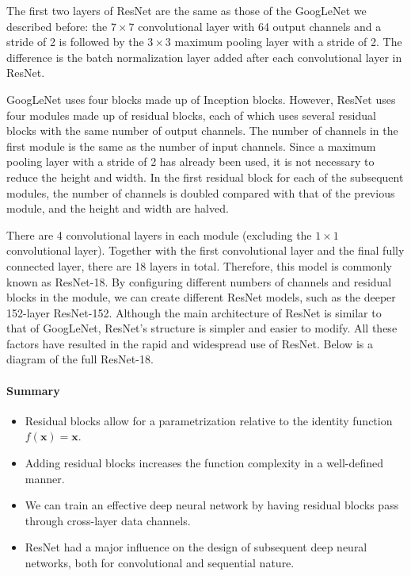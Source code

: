 The first two layers of ResNet are the same as those of the GoogLeNet we described before: the $7\times 7$ convolutional layer with 64 output channels and a stride of 2 is followed by the $3\times 3$ maximum pooling layer with a stride of 2. The difference is the batch normalization layer added after each convolutional layer in ResNet.

GoogLeNet uses four blocks made up of Inception blocks. However, ResNet uses four modules made up of residual blocks, each of which uses several residual blocks with the same number of output channels. The number of channels in the first module is the same as the number of input channels. Since a maximum pooling layer with a stride of 2 has already been used, it is not necessary to reduce the height and width. In the first residual block for each of the subsequent modules, the number of channels is doubled compared with that of the previous module, and the height and width are halved.

There are 4 convolutional layers in each module (excluding the $1\times 1$ convolutional layer). Together with the first convolutional layer and the final fully connected layer, there are 18 layers in total. Therefore, this model is commonly known as ResNet-18. By configuring different numbers of channels and residual blocks in the module, we can create different ResNet models, such as the deeper 152-layer ResNet-152. Although the main architecture of ResNet is similar to that of GoogLeNet, ResNet's structure is simpler and easier to modify. All these factors have resulted in the rapid and widespread use of ResNet. Below is a diagram of the full ResNet-18.

\paragraph{Summary}

\begin{itemize}
    \item Residual blocks allow for a parametrization relative to the identity function $f(\mathbf{x}) = \mathbf{x}$.
    \item Adding residual blocks increases the function complexity in a well-defined manner.
    \item We can train an effective deep neural network by having residual blocks pass through cross-layer data channels.
    \item ResNet had a major influence on the design of subsequent deep neural networks, both for convolutional and sequential nature.
\end{itemize}
 